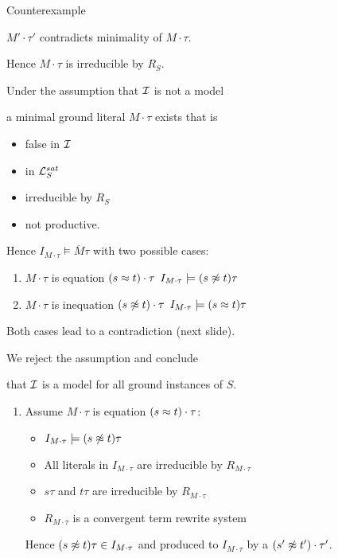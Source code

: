 \documentclass[%
handout,
]{beamer}
\begin{document}
\begin{frame}[allowframebreaks]{Counterexample}
\begin{itemize}
            $M'\cdot\tau'$ contradicts minimality of $M\cdot\tau$.

        \end{itemize}

        Hence $M\cdot\tau$ is irreducible by $R_S$.

\framebreak
        Under the assumption that $\mathcal{I}$ is not a model

        a minimal ground literal $M\cdot\tau$ exists that is
    \begin{itemize}
        \item false in $\mathcal{I}$
        \item in $\mathcal{L}_S^{sat}$
        \item irreducible by $R_S$
        \item not productive.
    \end{itemize}
    \vspace{1em}

    Hence $I_{M\cdot\tau}\models\overline{M}\tau$
    with two possible cases:

    \begin{enumerate}
        \item $M\cdot\tau$ is equation $(s\approx t)\cdot\tau$  \hfill $I_{M\cdot\tau}\models (s\not\approx t)\tau$
        \item $M\cdot\tau$ is inequation $(s\not\approx t)\cdot\tau$ \hfill $I_{M\cdot\tau}\models (s\approx t)\tau$
    \end{enumerate}

    \vspace{0.7em}
    Both cases lead to a contradiction (next slide).

    We reject the assumption and conclude

    that $\mathcal{I}$ is a model for all ground instances of $S$.

\framebreak


    \begin{enumerate}
        \item Assume $M\cdot\tau$ is equation $(s\approx t)\cdot\tau$:
        \begin{itemize}
            \item $I_{M\cdot\tau}\models (s\not\approx t)\tau$
            \item All literals in $I_{M\cdot\tau}$ are irreducible by $R_{M\cdot\tau}$
            \item $s\tau$ and $t\tau$ are irreducible by $R_{M\cdot\tau}$
            \item $R_{M\cdot\tau}$ is a convergent term rewrite system
        \end{itemize}
        Hence $(s\not\approx t)\tau\in I_{M\cdot\tau}$ and
        produced to $I_{M\cdot\tau}$ by a $(s'\not\approx t')\cdot\tau'$.


\end{enumerate}
\end{frame}
\end{document}
